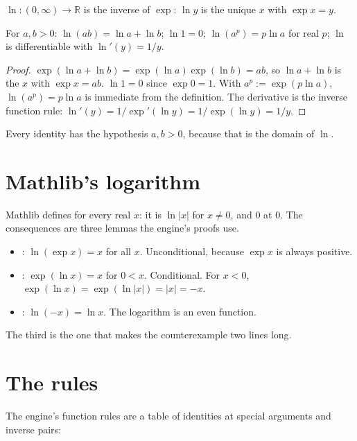 \begin{definition}
  $\ln : (0, \infty) \to \mathbb{R}$ is the inverse of $\exp$: $\ln y$ is the unique $x$ with
  $\exp x = y$.
\end{definition}

\begin{theorem}
  For $a, b > 0$: $\ln(ab) = \ln a + \ln b$; $\ln 1 = 0$; $\ln(a^p) = p \ln a$ for real $p$;
  $\ln$ is differentiable with $\ln'(y) = 1/y$.
\end{theorem}
\begin{proof}
  $\exp(\ln a + \ln b) = \exp(\ln a)\exp(\ln b) = ab$, so $\ln a + \ln b$ is the $x$ with
  $\exp x = ab$. $\ln 1 = 0$ since $\exp 0 = 1$. With $a^p := \exp(p \ln a)$, $\ln(a^p) = p \ln a$
  is immediate from the definition. The derivative is the inverse function rule:
  $\ln'(y) = 1/\exp'(\ln y) = 1/\exp(\ln y) = 1/y$.
\end{proof}

Every identity has the hypothesis $a, b > 0$, because that is the domain of $\ln$.

\section{Mathlib's logarithm}

Mathlib defines  for every real $x$: it is $\ln |x|$ for $x \neq 0$, and $0$ at
$0$. The consequences are three lemmas the engine's proofs use.

\begin{itemize}[nosep]
  \item {} : $\ln(\exp x) = x$ for all $x$. Unconditional, because $\exp x$ is
    always positive.
  \item {} : $\exp(\ln x) = x$ for $0 < x$. Conditional. For $x < 0$,
    $\exp(\ln x) = \exp(\ln|x|) = |x| = -x$.
  \item {} : $\ln(-x) = \ln x$. The logarithm is an even function.
\end{itemize}

The third is the one that makes the counterexample two lines long.

\section{The rules}

The engine's function rules are a table of identities at special arguments and inverse pairs:

